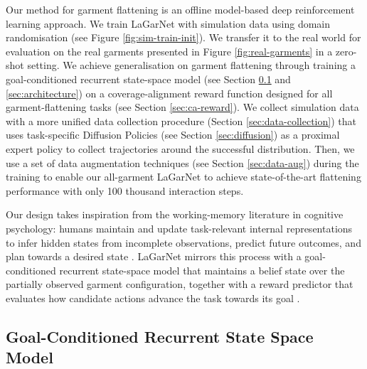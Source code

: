 \documentclass[journal]{IEEEtran}
\begin{document}
Our  method for garment flattening is an offline model-based deep reinforcement learning approach. We train LaGarNet with simulation data using domain randomisation (see Figure \ref{fig:sim-train-init}). We transfer it to the real world for evaluation on the real garments presented in Figure \ref{fig:real-garments} in a zero-shot setting. We achieve generalisation on garment flattening through training a goal-conditioned recurrent state-space model (see Section \ref{sec:gc-rssm} and \ref{sec:architecture}) on a coverage-alignment reward function designed for all garment-flattening tasks (see Section \ref{sec:ca-reward}). We collect simulation data with a more unified data collection procedure (Section \ref{sec:data-collection}) that uses task-specific Diffusion Policies (see Section \ref{sec:diffusion}) as a proximal expert policy to collect trajectories around the successful distribution. Then, we use a set of data augmentation techniques (see Section \ref{sec:data-aug}) during the training to enable our all-garment LaGarNet to achieve state-of-the-art flattening performance with only 100 thousand interaction steps.

Our design takes inspiration from the working-memory literature in cognitive psychology: humans maintain and update task-relevant internal representations to infer hidden states from incomplete observations, predict future outcomes, and plan towards a desired state \cite{miller2001integrative}. LaGarNet mirrors this process with a goal-conditioned recurrent state-space model that maintains a belief state over the partially observed garment configuration, together with a reward predictor that evaluates how candidate actions advance the task towards its goal \cite{hafner2019learning}.


\subsection{Goal-Conditioned Recurrent State Space Model} \label{sec:gc-rssm}
\end{document}
